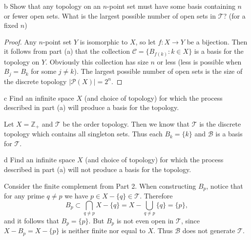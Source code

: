 \documentclass[11pt]{article}
\begin{document}
\begin{p}{b}
  Show that any topology on an $n$-point set must have some basis containing $n$
  or fewer open sets. What is the largest possible number of open sets in
  $\mathcal{T}$? (for a fixed $n$)
\end{p}

\begin{proof}
  Any $n$-point set $Y$ is isomorphic to $X$, so let $f: X \to Y$ be a
  bijection. Then it follows from part (a) that the collection $\mathcal{C} = \{ B_{f(k)} : k
  \in X \}$ is a basis for the topology on $Y$. Obviously this collection has
  size $n$ or less (less is possible when $B_j = B_k$ for some $j \ne k$). The
  largest possible number of open sets is the size of the discrete topology
  $|\mathcal{P}(X)| = 2^n$.
\end{proof}

\begin{p}{c}
  Find an infinite space $X$ (and choice of topology) for which the
  process described in part (a) will produce a basis for the topology.
\end{p}

\begin{solution}
  Let $X = \mathbb{Z}_+$ and $\mathcal{T}$ be the order topology. Then we know
  that $\mathcal{T}$ is the discrete topology which contains all singleton sets.
  Thus each $B_k = \{k\}$ and $\mathcal{B}$ is a basis for $\mathcal{T}$.
\end{solution}

\begin{p}{d}
  Find an infinite space $X$ (and choice of topology) for which the
  process described in part (a) will not produce a basis for the topology.
\end{p}

\begin{solution}
  Consider the finite complement from Part 2. When constructing $B_p$, notice
  that for any prime $q \ne p$ we have $p \in X - \{q\} \in \mathcal{T}$.
  Therefore
  \[ B_p \subset \bigcap_{q \ne p} X - \{q\} = X - \bigcup_{q\ne p} \{q\} =
  \{p\}, \]
  and it follows that $B_p = \{p\}$. But $B_p$ is not even open in
  $\mathcal{T}$, since $X - B_p = X - \{p\}$ is neither finite nor equal to $X$.
  Thus $\mathcal{B}$ does not generate $\mathcal{T}$.
\end{solution}
\end{document}
